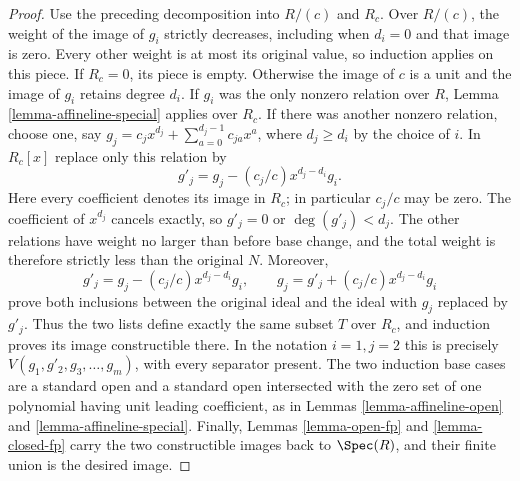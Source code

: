 \begin{proof}
\medskip\noindent
Use the preceding decomposition into $R/(c)$ and $R_c$. Over $R/(c)$,
the weight of the image of $g_i$ strictly decreases, including when
$d_i=0$ and that image is zero. Every other weight is at most its
original value, so induction applies on this piece.
If $R_c=0$, its piece is empty. Otherwise the image of $c$ is a unit
and the image of $g_i$ retains degree $d_i$. If $g_i$ was the only
nonzero relation over $R$, Lemma \ref{lemma-affineline-special}
applies over $R_c$. If there was another nonzero relation, choose
one, say
$g_j=c_jx^{d_j}+\sum_{a=0}^{d_j-1}c_{ja}x^a$, where $d_j\geq d_i$
by the choice of $i$. In $R_c[x]$ replace only this relation by
$$
g'_j=g_j-(c_j/c)x^{d_j-d_i}g_i.
$$
Here every coefficient denotes its image in $R_c$; in particular
$c_j/c$ may be zero. The coefficient of $x^{d_j}$ cancels exactly,
so $g'_j=0$ or $\deg(g'_j)<d_j$. The other relations have weight
no larger than before base change, and the total weight is therefore
strictly less than the original $N$. Moreover,
$$
g'_j=g_j-(c_j/c)x^{d_j-d_i}g_i,\qquad
g_j=g'_j+(c_j/c)x^{d_j-d_i}g_i
$$
prove both inclusions between the original ideal and the ideal with
$g_j$ replaced by $g'_j$. Thus the two lists define exactly the same
subset $T$ over $R_c$, and induction proves its image constructible
there. In the notation $i=1,j=2$ this is precisely
$V(g_1,g'_2,g_3,\ldots,g_m)$, with every separator present.
The two induction base cases are a standard open and a standard open
intersected with the zero set of one polynomial having unit leading
coefficient, as in Lemmas \ref{lemma-affineline-open} and
\ref{lemma-affineline-special}. Finally,
Lemmas \ref{lemma-open-fp} and \ref{lemma-closed-fp} carry the two
constructible images back to $\Spec(R)$, and their finite union is
the desired image.
\end{proof}
